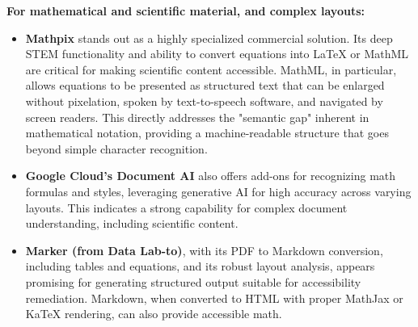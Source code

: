 \textbf{For mathematical and scientific material, and complex layouts:}
\begin{itemize}
    \item \textbf{Mathpix} stands out as a highly specialized commercial solution. Its deep STEM functionality and ability to convert equations into LaTeX or MathML  are critical for making scientific content accessible. MathML, in particular, allows equations to be presented as structured text that can be enlarged without pixelation, spoken by text-to-speech software, and navigated by screen readers. This directly addresses the "semantic gap" inherent in mathematical notation, providing a machine-readable structure that goes beyond simple character recognition.
    \item \textbf{Google Cloud's Document AI} also offers add-ons for recognizing math formulas and styles, leveraging generative AI for high accuracy across varying layouts. This indicates a strong capability for complex document understanding, including scientific content.
    \item \textbf{Marker (from Data Lab-to)}, with its PDF to Markdown conversion, including tables and equations, and its robust layout analysis, appears promising for generating structured output suitable for accessibility remediation. Markdown, when converted to HTML with proper MathJax or KaTeX rendering, can also provide accessible math.
\end{itemize}

